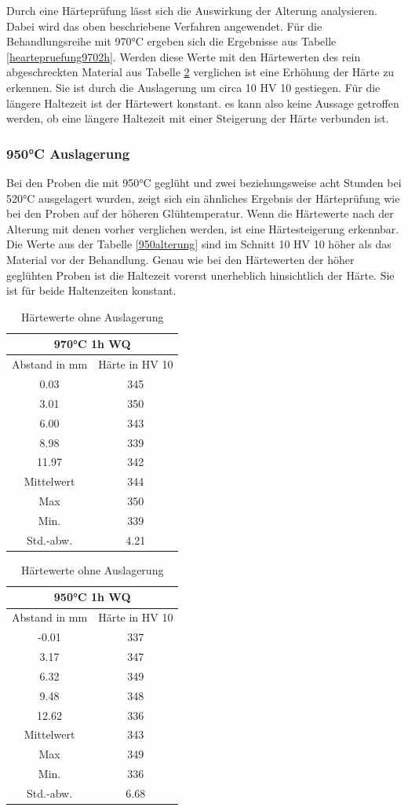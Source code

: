 \documentclass[a4paper, 11pt]{tubsreprt}
\begin{document}
Durch eine Härteprüfung lässt sich die Auswirkung der Alterung analysieren. Dabei wird das oben beschriebene Verfahren angewendet. Für die Behandlungsreihe mit 970°C ergeben sich die Ergebnisse aus Tabelle \ref{heartepruefung9702h}. Werden diese Werte mit den Härtewerten des rein abgeschreckten Material aus Tabelle \ref{Hearte ohne Behandlung} verglichen ist eine Erhöhung der Härte zu erkennen. Sie ist durch die Auslagerung um circa 10 HV 10 gestiegen. Für die längere Haltezeit ist der Härtewert konstant. es kann also keine Aussage getroffen werden, ob eine längere Haltezeit mit einer Steigerung der Härte verbunden ist. 

\subsubsection{950°C Auslagerung}
Bei den Proben die mit 950°C geglüht und zwei beziehungsweise acht Stunden bei 520°C ausgelagert wurden, zeigt sich ein ähnliches Ergebnis der Härteprüfung wie bei den Proben auf der höheren Glühtemperatur. Wenn die Härtewerte nach der Alterung mit denen vorher verglichen werden, ist eine Härtesteigerung erkennbar. Die Werte aus der Tabelle \ref{950alterung} sind im Schnitt 10 HV 10 höher als das Material vor der Behandlung. Genau wie bei den Härtewerten der höher geglühten Proben ist die Haltezeit vorerst unerheblich hinsichtlich der Härte. Sie ist für beide Haltenzeiten konstant.
\begin{table}[t]	%
\begin{tabular}{c|c}
\multicolumn{2}{c}{970°C 1h WQ} \\
\hline 
Abstand in mm	& Härte in HV 10 \\
0.03	& 345\\
3.01	& 350\\
6.00	& 343\\
8.98	& 339 \\
11.97	& 342\\
Mittelwert	& 344 \\
Max	& 350 \\
Min.	& 339 \\
Std.-abw. &	4.21 \\

\end{tabular}
\begin{tabular}{c|c}
\multicolumn{2}{c}{950°C 1h WQ} \\
\hline 	
Abstand in mm	& 	Härte in HV 10 \\
-0.01	&	337 \\
3.17	&	347 \\
6.32	&	349 \\
9.48	&	348 \\ 
12.62	&	336 \\
Mittelwert &	343 \\
Max	&	349 \\
Min.	&	336 \\
Std.-abw.	&	6.68 \\

\end{tabular}
\caption{Härtewerte ohne Auslagerung}
\label{Hearte ohne Behandlung}
\end{table}
\end{document}
